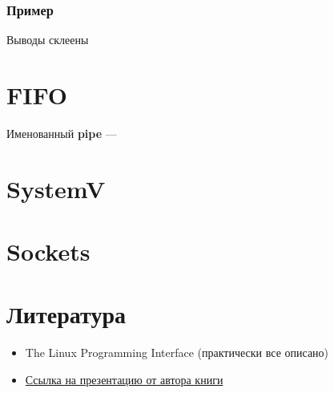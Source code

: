 \documentclass[../../lectures.tex]{subfiles}
\begin{document}
\subsubsection{Пример}
Выводы склеены

\section{FIFO}
Именованный \textbf{pipe} --- 

\section{SystemV}
\todo{}

\section{Sockets}
\todo{}

\section{Литература}
\begin{itemize}
    \item The Linux Programming Interface (практически все описано)
    \item \textcolor{blue}{
        \href{http://man7.org/conf/lca2013/IPC_Overview-LCA-2013-printable.pdf}{Ссылка на презентацию от автора книги}
    }
\end{itemize}
\end{document}

